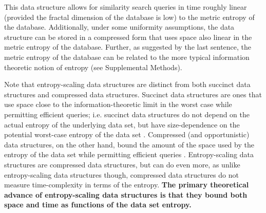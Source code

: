 \documentclass[review,preprint,12pt]{elsarticle}
\renewcommand{\cite}{\citep} %
\theoremstyle{definition}
\theoremstyle{remark}
\begin{document}
This data structure allows for similarity search queries in time roughly linear (provided the fractal dimension of the database is low) to the metric entropy of the database.
Additionally, under some uniformity assumptions, the data structure can be stored in a compressed form that uses space also linear in the metric entropy of the database.
Further, as suggested by the last sentence, the metric entropy of the database can be related to the more typical information theoretic notion of entropy (see Supplemental Methods).

Note that entropy-scaling data structures are distinct from both succinct data structures and compressed data structures.
Succinct data structures are ones that use space close to the information-theoretic limit in the worst case while permitting efficient queries; i.e.
succinct data structures do not depend on the actual entropy of the underlying data set, but have size-dependence on the potential worst-case entropy of the data set \cite{jacobson1988succinct}.
Compressed (and opportunistic) data structures, on the other hand, bound the amount of the space used by the entropy of the data set while permitting efficient queries \cite{grossi2005compressed, ferragina2000opportunistic}.
Entropy-scaling data structures are compressed data structures, but can do even more, as
unlike entropy-scaling data structures though, compressed data structures do not measure time-complexity in terms of the entropy.
\textbf{The primary theoretical advance of entropy-scaling data structures is that they bound both space and time as functions of the data set entropy.}
\end{document}
